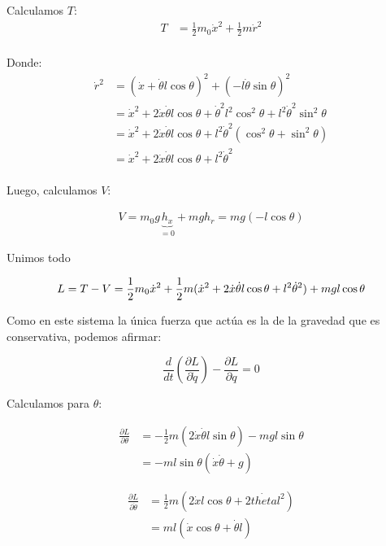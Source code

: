 \documentclass[11pt]{article}
\begin{document}
\newpage

Calculamos $T$:
\begin{align*}
  T &= \frac{1}{2} m_0 \dot{x}^2 + \frac{1}{2} m \dot{r}^2 \\
\end{align*}

Donde: 
\begin{align*}
  \dot{r}^2 &= (\dot{x} + \dot{\theta} l \cos \theta)^2 + (-l \dot{\theta} \sin \theta)^2 \\
            &= \dot{x}^2 + 2 \dot{x}  \dot{\theta} l \cos \theta + \dot{\theta}^2 l^2 \cos^2 \theta
            + l^2 \dot{\theta}^2 \sin^2 \theta \\
            &= \dot{x}^2 + 2 \dot{x}  \dot{\theta} l \cos \theta + l^2 \dot{\theta}^2 (\cos^2 \theta + \sin^2 \theta) \\
            &= \dot{x}^2 + 2 \dot{x}  \dot{\theta} l \cos \theta + l^2 \dot{\theta}^2 \\
\end{align*}

Luego, calculamos $V$:

\begin{align*}
  V = m_0 g \underbrace{h_{x}}_{= 0} + m g h_{r} = m g (-l \cos \theta)
\end{align*}

Unimos todo

\begin{equation*}
  L = T - V = \frac{1}{2} m_0 \dot{x}^2 +
    \frac{1}{2} m (\dot{x}^2 + 2 \dot{x}  \dot{\theta} l \cos \theta + l^2 \dot{\theta}^2)
    + m g l \cos \theta \\
\end{equation*}

Como en este sistema la única fuerza que actúa es la de la gravedad que es
conservativa, podemos afirmar:

\begin{equation*}
  \frac{d}{dt} (\frac{\partial L}{\partial \dot{q}}) - \frac{\partial L}{\partial q} = 0
\end{equation*}

Calculamos para $\theta$:

\begin{align*}
  \frac{\partial L}{\partial \theta} &= -\frac{1}{2}m(2 \dot{x}  \dot{\theta} l \sin \theta)
    - m g l \sin \theta \\
    &= -ml\sin \theta (\dot{x} \dot{\theta} + g)
\end{align*}

\begin{align*}
  \frac{\partial L}{\partial \dot{\theta}} &= \frac{1}{2}m (2 \dot{x} l \cos \theta 
    + 2\dot{theta} l^2) \\
    &= ml(\dot{x} \cos \theta + \dot{\theta} l)
\end{align*}
\end{document}
